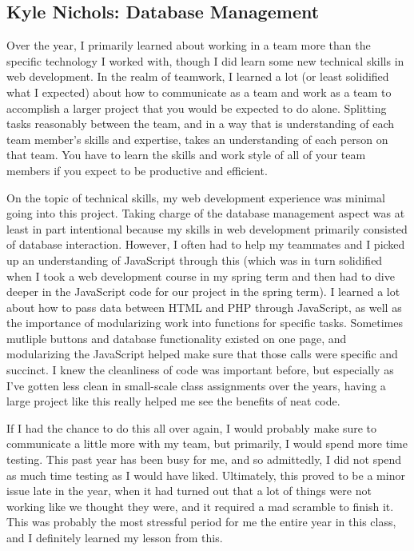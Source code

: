 \documentclass[../final.tex]{subfiles}
\begin{document}
\subsection{Kyle Nichols: Database Management}
Over the year, I primarily learned about working in a team more than the specific technology I worked with, though I did learn some new technical skills in web development.
In the realm of teamwork, I learned a lot (or least solidified what I expected) about how to communicate as a team and work as a team to accomplish a larger project that you would be expected to do alone.
Splitting tasks reasonably between the team, and in a way that is understanding of each team member's skills and expertise, takes an understanding of each person on that team.
You have to learn the skills and work style of all of your team members if you expect to be productive and efficient.

On the topic of technical skills, my web development experience was minimal going into this project.
Taking charge of the database management aspect was at least in part intentional because my skills in web development primarily consisted of database interaction.
However, I often had to help my teammates and I picked up an understanding of JavaScript through this (which was in turn solidified when I took a web development course in my spring term and then had to dive deeper in the JavaScript code for our project in the spring term).
I learned a lot about how to pass data between HTML and PHP through JavaScript, as well as the importance of modularizing work into functions for specific tasks.
Sometimes mutliple buttons and database functionality existed on one page, and modularizing the JavaScript helped make sure that those calls were specific and succinct.
I knew the cleanliness of code was important before, but especially as I've gotten less clean in small-scale class assignments over the years, having a large project like this really helped me see the benefits of neat code.

If I had the chance to do this all over again, I would probably make sure to communicate a little more with my team, but primarily, I would spend more time testing.
This past year has been busy for me, and so admittedly, I did not spend as much time testing as I would have liked.
Ultimately, this proved to be a minor issue late in the year, when it had turned out that a lot of things were not working like we thought they were, and it required a mad scramble to finish it.
This was probably the most stressful period for me the entire year in this class, and I definitely learned my lesson from this.
\end{document}
